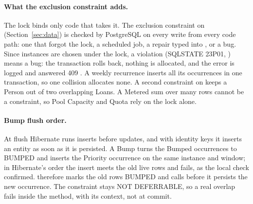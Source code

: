\paragraph{What the exclusion constraint adds.} The lock binds only code that takes it. The exclusion constraint on  (Section~\ref{sec:data}) is checked by PostgreSQL on every write from every code path: one that forgot the lock, a scheduled job, a repair typed into , or a bug. Since instances are chosen under the lock, a violation (SQLSTATE 23P01, ) means a bug: the transaction rolls back, nothing is allocated, and the error is logged and answered 409 . A weekly recurrence inserts all its occurrences in one transaction, so one collision allocates none. A second constraint on  keeps a Person out of two overlapping Loans. A Metered sum over many rows cannot be a constraint, so Pool Capacity and Quota rely on the lock alone.

\paragraph{Bump flush order.} At flush Hibernate runs inserts before updates, and with identity keys it inserts an entity as soon as it is persisted. A Bump turns the Bumped occurrences to BUMPED and inserts the Priority occurrence on the same instance and window; in Hibernate's order the insert meets the old live rows and fails, as the local check confirmed.  therefore marks the old rows BUMPED and calls  before it persists the new occurrence. The constraint stays NOT DEFERRABLE, so a real overlap fails inside the method, with its context, not at commit.

